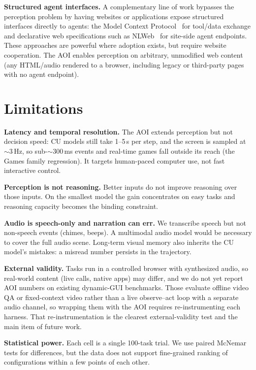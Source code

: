 \documentclass[11pt]{article}
\begin{document}
\textbf{Structured agent interfaces.}
A complementary line of work bypasses the perception problem by having
websites or applications expose structured interfaces directly to agents:
the Model Context Protocol~\citep{mcp} for tool/data exchange and
declarative web specifications such as NLWeb~\citep{nlweb} for site-side
agent endpoints.
These approaches are powerful where adoption exists, but require website
cooperation. The AOI enables perception on arbitrary, unmodified web
content (any HTML/audio rendered to a browser, including legacy or
third-party pages with no agent endpoint).

\section{Limitations}
\label{sec:limitations}

\textbf{Latency and temporal resolution.}
The AOI extends perception but not decision speed: CU models still take 1--5\,s per
step, and the screen is sampled at ${\sim}3$\,Hz, so sub-${\sim}300$\,ms events and
real-time games fall outside its reach (the Games family regression).
It targets human-paced computer use, not fast interactive control.

\textbf{Perception is not reasoning.}
Better inputs do not improve reasoning over those inputs. On the smallest model the
gain concentrates on easy tasks and reasoning capacity becomes the binding
constraint.

\textbf{Audio is speech-only and narration can err.}
We transcribe speech but not non-speech events (chimes, beeps). A multimodal audio
model would be necessary to cover the full audio scene.
Long-term visual memory also inherits the CU model's mistakes: a misread number
persists in the trajectory.

\textbf{External validity.}
Tasks run in a controlled browser with synthesized audio, so real-world content
(live calls, native apps) may differ, and we do not yet report AOI numbers on
existing dynamic-GUI benchmarks. Those evaluate offline video QA or fixed-context
video rather than a live observe--act loop with a separate audio channel, so
wrapping them with the AOI requires re-instrumenting each harness.
That re-instrumentation is the clearest external-validity test and the main item of
future work.

\textbf{Statistical power.}
Each cell is a single 100-task trial. We use paired McNemar tests for differences,
but the data does not support fine-grained ranking of configurations within a few
points of each other.
\end{document}
